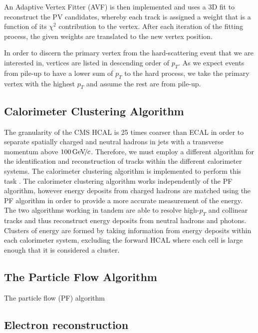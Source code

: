An Adaptive Vertex Fitter (AVF) \cite{1742-6596-110-9-092009} is then implemented and uses a 3D fit to reconstruct the PV candidates, whereby each track is assigned a weight that is a function of its $\chi^2$ contribution to the vertex. After each iteration of the fitting process, the given weights are translated to the new vertex position. 

In order to discern the primary vertex from the hard-scattering event that we are interested in, vertices are listed in descending order of $p_T$. As we expect events from pile-up to have a lower sum of $p_T$ to the hard process, we take the primary vertex with the highest $p_T$ and assume the rest are from pile-up.  

\subsection{Calorimeter Clustering Algorithm} \label{subsec-CalorimeterClusteringAlgorithm}

The granularity of the CMS HCAL is 25 times coarser than ECAL in order to separate spatially charged and neutral hadrons in jets with a transverse momentum above $100 {\,\text{Ge\hspace{-.08em}V\hspace{-0.16em}/\hspace{-0.08em}}c}$. Therefore, we must employ a different algorithm for the identification and reconstruction of tracks within the different calorimeter systems. The calorimeter clustering algorithm is implemented to perform this task \cite{CMS-PAS-PFT-09-001}. The calorimeter clustering algorithm works independently of the PF algorithm, however energy deposits from charged hadrons are matched using the PF algorithm in order to provide a more accurate measurement of the energy. The two algorithms working in tandem are able to resolve high-$p_T$ and collinear tracks and thus reconstruct energy deposits from neutral hadrons and photons. Clusters of energy are formed by taking information from energy deposits within each calorimeter system, excluding the forward HCAL where each cell is large enough that it is considered a cluster.


\subsection{The Particle Flow Algorithm} \label{subsec-PFAlgorithm}

The particle flow (PF) algorithm

\subsection{Electron reconstruction} \label{subsec-ElectronReconstruction}

